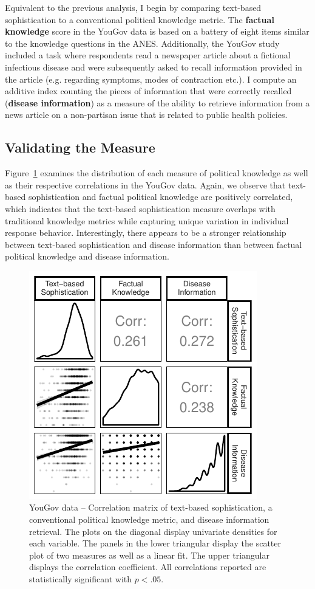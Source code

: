 \documentclass[12pt]{article}
\begin{document}
Equivalent to the previous analysis, I begin by comparing text-based sophistication to a conventional political knowledge metric. The \textbf{factual knowledge} score in the YouGov data is based on a battery of eight items similar to the knowledge questions in the ANES. Additionally, the YouGov study included a task where respondents read a newspaper article about a fictional infectious disease and were subsequently asked to recall information provided in the article (e.g. regarding symptoms, modes of contraction etc.). I compute an additive index counting the pieces of information that were correctly recalled (\textbf{disease information}) as a measure of the ability to retrieve information from a news article on a non-partisan issue that is related to public health policies.


\subsection*{Validating the Measure}

Figure~\ref{fig:yg_corplot} examines the distribution of each measure of political knowledge as well as their respective correlations in the YouGov data. Again, we observe that text-based sophistication and factual political knowledge are positively correlated, which indicates that the text-based sophistication measure overlaps with traditional knowledge metrics while capturing unique variation in individual response behavior. Interestingly, there appears to be a stronger relationship between text-based sophistication and disease information than between factual political knowledge and disease information.

\begin{figure}[h]\centering
\includegraphics{../fig/yg_corplot.pdf}
\caption{YouGov data -- Correlation matrix of text-based sophistication, a conventional political knowledge metric, and disease information retrieval. The plots on the diagonal display univariate densities for each variable. The panels in the lower triangular display the scatter plot of two measures as well as a linear fit. The upper triangular displays the correlation coefficient. All correlations reported are statistically significant with $p<.05$.}\label{fig:yg_corplot}
\end{figure}
\end{document}
